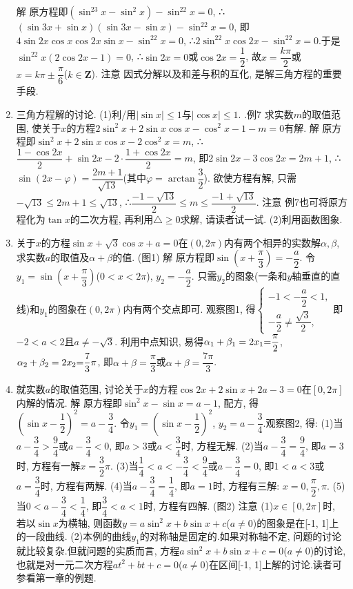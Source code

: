 \documentclass[10pt,a4paper]{article}
\begin{document}
\begin{enumerate}[1.]
解  原方程即$(\sin ^23x-\sin ^2x)-\sin ^22x=0$,
∴$(\sin 3x+\sin x)(\sin 3x-\sin x)-\sin ^22x=0$, 即$4\sin 2x\cos x\cos 2x\sin x-\sin ^22x=0$,
∴$2\sin ^22x\cos 2x-\sin ^22x=0$.于是$\sin ^22x(2\cos 2x-1)=0$,
∴$\sin 2x=0$或$\cos 2x=\dfrac 12$, 故$x=\dfrac{k\pi }2$或$x=k\pi \pm \dfrac{\pi }6$($k\in \mathbf{Z}$).
注意  因式分解以及和差与积的互化, 是解三角方程的重要手段.
\item 三角方程解的讨论.
(1)利/用$|\sin x|\le 1$与$|\cos x|\le 1$.
.例7  求实数$m$的取值范围, 使关于$x$的方程$2\sin ^2x+2\sin x\cos x-\cos ^2x-1-m=0$有解.
解  原方程即$\sin ^2x+2\sin x\cos x-2\cos ^2x=m$, ∴$\dfrac{1-\cos 2x}2+\sin 2x-2\cdot \dfrac{1+\cos 2x}2=m$,
即$2\sin 2x-3\cos 2x=2m+1$, ∴$\sin (2x-\varphi)=\dfrac{2m+1}{\sqrt {13}}$(其中$\varphi =\arctan \dfrac 32$).
欲使方程有解, 只需$-\sqrt {13}\le 2m+1\le \sqrt {13}$, ∴$\dfrac{-1-\sqrt {13}}2\le m\le \dfrac{-1+\sqrt {13}}2$.
注意  例7也可将原方程化为$\tan x$的二次方程, 再利用$\triangle \ge 0$求解, 请读者试一试.
(2)利用函数图象.
\item 关于$x$的方程$\sin x+\sqrt 3\cos x+a=0$在$(0,2\pi)$内有两个相异的实数解$\alpha ,\beta$, 求实数$a$的取值及$\alpha +\beta$的值.
(图1)
解  原方程即$\sin (x+\dfrac{\pi }3)=-\dfrac a2$.
令$y_1=\sin (x+\dfrac{\pi }3)$($0<x<2\pi$), $y_2=-\dfrac a2$.
只需$y_2$的图象(一条和$y$轴垂直的直线)和$y_1$的图象在$(0,2\pi)$内有两个交点即可.
观察图1, 得$\begin{cases} -1<-\dfrac a2<1, \\ -\dfrac a2\ne \dfrac{\sqrt 3}2, \end{cases}$即$-2<a<2$且$a\ne -\sqrt 3$.
利用中点知识, 易得$\alpha _1+\beta _1=2x_1\text=\dfrac{\pi }2$, $\alpha _2+\beta _2=2x_2\text=\dfrac 73\pi$, 即$\alpha +\beta =\dfrac{\pi }3$或$\alpha +\beta =\dfrac{7\pi }3$.
\item 就实数$a$的取值范围, 讨论关于$x$的方程$\cos 2x+2\sin x+2a-3=0$在$[0,2\pi]$内解的情况.
解  原方程即$\sin ^2x-\sin x=a-1$, 配方, 得$(\sin x-\dfrac 12)^2=a-\dfrac 34$.
令$y_1=(\sin x-\dfrac 12)^2$, $y_2=a-\dfrac 34$.观察图2, 得:
(1)当$a-\dfrac 34>\dfrac 94$或$a-\dfrac 34<0$, 即$a>3$或$a<\dfrac 34$时, 方程无解.
(2)当$a-\dfrac 34=\dfrac 94$, 即$a=3$时, 方程有一解$x=\dfrac 32\pi$.
(3)当$\dfrac 14<a<-\dfrac 34<\dfrac 94$或$a-\dfrac 34=0$, 即$1<a<3$或$a=\dfrac 34$时, 方程有两解.
(4)当$a-\dfrac 34=\dfrac 14$, 即$a=1$时, 方程有三解: $x=0,\dfrac{\pi }2,\pi$.
(5)当$0<a-\dfrac 34<\dfrac 14$, 即$\dfrac 34<a<1$时, 方程有四解.
(图2)
注意  (1)$x\in [0,2\pi]$时, 若以$\sin x$为横轴, 则函数$y=a\sin ^2x+b\sin x+c$($a\ne 0$)的图象是在[-1, 1]上的一段曲线.
(2)本例的曲线$y_1$的对称轴是固定的.如果对称轴不定, 问题的讨论就比较复杂.但就问题的实质而言, 方程$a\sin ^2x+b\sin x+c=0$($a\ne 0$)的讨论, 也就是对一元二次方程$at^2+bt+c=0$($a\ne 0$)在区间[-1, 1]上解的讨论.读者可参看第一章的例题.

\end{enumerate}
\end{document}
